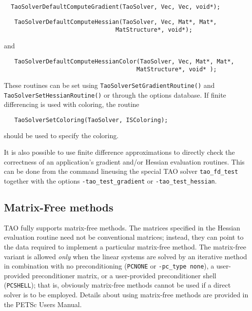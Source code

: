 \begin{verbatim}
  TaoSolverDefaultComputeGradient(TaoSolver, Vec, Vec, void*);
\end{verbatim}


\begin{verbatim}
   TaoSolverDefaultComputeHessian(TaoSolver, Vec, Mat*, Mat*, 
                                MatStructure*, void*);
\end{verbatim}
\noindent
and 
\begin{verbatim}
   TaoSolverDefaultComputeHessianColor(TaoSolver, Vec, Mat*, Mat*, 
                                      MatStructure*, void* );
\end{verbatim}
\noindent
These routines can be set using {\tt TaoSolverSetGradientRoutine()} and 
{\tt TaoSolverSetHessianRoutine()} or through the options database.
If finite differencing is used with coloring, the routine 
\begin{verbatim}
   TaoSolverSetColoring(TaoSolver, ISColoring);
\end{verbatim}
\noindent
should be used to specify the coloring.

It is also possible to use finite difference approximations to directly check
the correctness of an application's gradient and/or Hessian evaluation routines.
This can be done from the command lineusing the special TAO solver 
{\tt tao\_fd\_test} together with the options
{\tt -tao\_test\_gradient} or {\tt -tao\_test\_hessian}.


\subsection{Matrix-Free methods}
TAO fully supports matrix-free methods. The matrices specified in the
Hessian evaluation routine need not be conventional
matrices; instead, they can point to the data required to implement a
particular matrix-free method.  The matrix-free variant is allowed
{\em only} when the linear systems are solved by an iterative method
in combination with no preconditioning ({\tt PCNONE} or {\tt -pc\_type none}),
a user-provided preconditioner matrix, or a user-provided preconditioner
shell ({\tt PCSHELL}); that is,
obviously matrix-free methods cannot be used if a direct solver is to 
be employed.  %
Details about using matrix-free methods are provided in the
PETSc  Users Manual.


